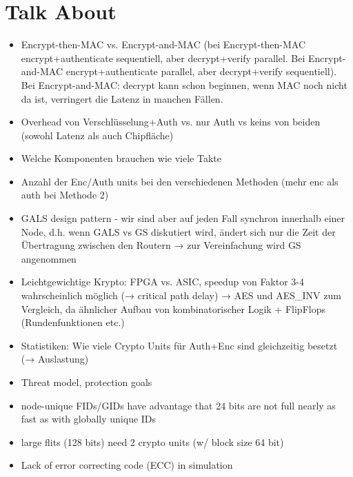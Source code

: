 \documentclass[
	paper=a4,
	fontsize=11pt,
	parskip=full %
]{scrreprt}
\begin{document}
    \chapter{Talk About}
    \begin{itemize}
        \item Encrypt-then-MAC vs. Encrypt-and-MAC (bei Encrypt-then-MAC encrypt+authenticate sequentiell, aber decrypt+verify parallel.
            Bei Encrypt-and-MAC encrypt+authenticate parallel, aber decrypt+verify sequentiell). Bei Encrypt-and-MAC: decrypt kann schon
            beginnen, wenn MAC noch nicht da ist, verringert die Latenz in manchen Fällen.
        \item Overhead von Verschlüsselung+Auth vs. nur Auth vs keins von beiden (sowohl Latenz als auch Chipfläche)
        \item Welche Komponenten brauchen wie viele Takte
        \item Anzahl der Enc/Auth units bei den verschiedenen Methoden (mehr enc als auth bei Methode 2)
        \item GALS design pattern - wir sind aber auf jeden Fall synchron innerhalb einer Node, d.h. wenn GALS vs GS diskutiert wird,
            ändert sich nur die Zeit der Übertragung zwischen den Routern → zur Vereinfachung wird GS angenommen
        \item Leichtgewichtige Krypto: FPGA vs. ASIC, speedup von Faktor 3-4 wahrscheinlich möglich (→ critical path delay) \cite{kuon07fpgavsasic}
            → AES und AES\_INV zum Vergleich, da ähnlicher Aufbau von kombinatorischer Logik + FlipFlops (Rundenfunktionen etc.)
        \item Statistiken: Wie viele Crypto Units für Auth+Enc sind gleichzeitig besetzt (→ Auslastung)
        \item Threat model, protection goals
        \item node-unique FIDs/GIDs have advantage that 24 bits are not full nearly as fast as with globally unique IDs
		\item large flits (128 bits) need 2 crypto units (w/ block size 64 bit)
        \item Lack of error correcting code (ECC) in simulation
    \end{itemize}
\end{document}
